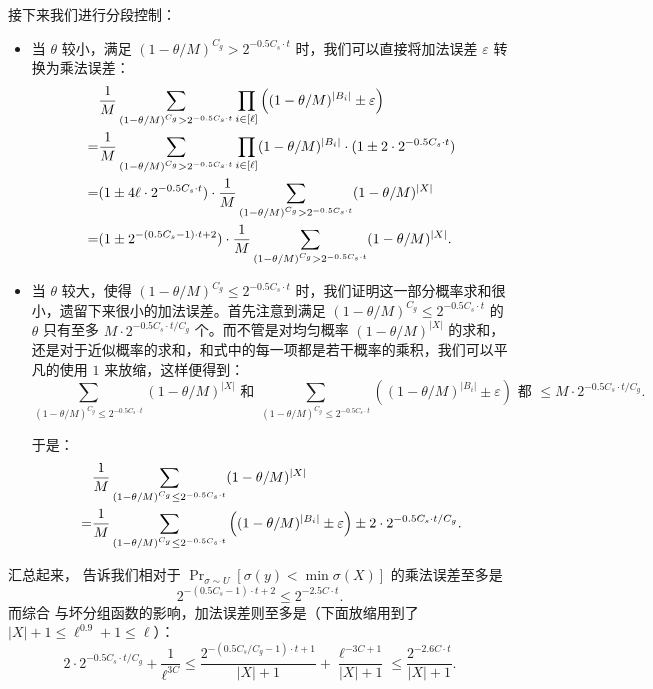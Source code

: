 接下来我们进行分段控制：
\begin{itemize}
    \item 当 $\theta$ 较小，满足 $(1 - \theta / M)^{C_g} > 2^{-0.5 C_s \cdot t}$ 时，我们可以直接将加法误差 $\varepsilon$ 转换为乘法误差：
    \begin{align}
          & \frac{1}{M} \sum_{(1 - \theta / M)^{C_g} > 2^{-0.5 C_s \cdot t}} \prod_{i \in [\ell]} \left( (1 - \theta / M)^{|B_i|} \pm \varepsilon \right) \notag \\
        = & \frac{1}{M} \sum_{(1 - \theta / M)^{C_g} > 2^{-0.5 C_s \cdot t}} \prod_{i \in [\ell]} (1 - \theta / M)^{|B_i|} \cdot (1 \pm 2 \cdot 2^{-0.5 C_s \cdot t}) \notag \\
        = & (1 \pm 4 \ell \cdot 2^{-0.5 C_s \cdot t}) \cdot \frac{1}{M} \sum_{(1 - \theta / M)^{C_g} > 2^{-0.5 C_s \cdot t}} (1 - \theta / M)^{|X|} \notag \\
        = & (1 \pm 2^{-(0.5 C_s - 1) \cdot t + 2}) \cdot \frac{1}{M} \sum_{(1 - \theta / M)^{C_g} > 2^{-0.5 C_s \cdot t}} (1 - \theta / M)^{|X|}. \label{eq:X1_theta_small}
    \end{align}

    \item 当 $\theta$ 较大，使得 $(1 - \theta / M)^{C_g} \le 2^{-0.5 C_s \cdot t}$ 时，我们证明这一部分概率求和很小，遗留下来很小的加法误差。首先注意到满足 $(1 - \theta / M)^{C_g} \le 2^{-0.5 C_s \cdot t}$ 的 $\theta$ 只有至多 $M \cdot 2^{-0.5 C_s \cdot t / C_g}$ 个。而不管是对均匀概率 $(1 - \theta / M)^{|X|}$ 的求和，还是对于近似概率的求和，和式中的每一项都是若干概率的乘积，我们可以平凡的使用 $1$ 来放缩，这样便得到：
    $$
    \sum_{(1 - \theta / M)^{C_g} \le 2^{-0.5 C_s \cdot t}} (1 - \theta / M)^{|X|}\text{ 和 }\sum_{(1 - \theta / M)^{C_g}\le 2^{-0.5 C_s \cdot t}} \left( (1 - \theta / M)^{|B_i|} \pm \varepsilon \right)\text{ 都 }\le M \cdot 2^{-0.5 C_s \cdot t / C_g}.
    $$

    于是：
    \begin{align}
          & \frac{1}{M} \sum_{(1 - \theta / M)^{C_g} \le 2^{-0.5 C_s \cdot t}} (1 - \theta / M)^{|X|} \notag \\
        = & \frac{1}{M} \sum_{(1 - \theta / M)^{C_g}\le 2^{-0.5 C_s \cdot t}} \left( (1 - \theta / M)^{|B_i|} \pm \varepsilon \right) \pm 2 \cdot 2^{-0.5 C_s \cdot t / C_g}. \label{eq:X1_theta_big}
    \end{align}
\end{itemize}

汇总起来， 告诉我们相对于 $\Pr_{\sigma \sim U}[\sigma(y) < \min \sigma(X)]$ 的乘法误差至多是
$$
2^{-(0.5 C_s - 1) \cdot t + 2} \le 2^{-2.5 C \cdot t}.
$$
而综合  与坏分组函数的影响，加法误差则至多是（下面放缩用到了 $|X| + 1 \le \ell^{0.9} + 1 \le \ell$）：
$$
2 \cdot 2^{-0.5 C_s \cdot t / C_g} + \frac{1}{\ell^{3 C}} \le \frac{2^{-(0.5 C_s / C_g - 1) \cdot t + 1}}{|X| + 1} + \frac{\ell^{-3 C + 1}}{|X| + 1} \le \frac{2^{-2.6 C \cdot t}}{|X| + 1}.
$$

